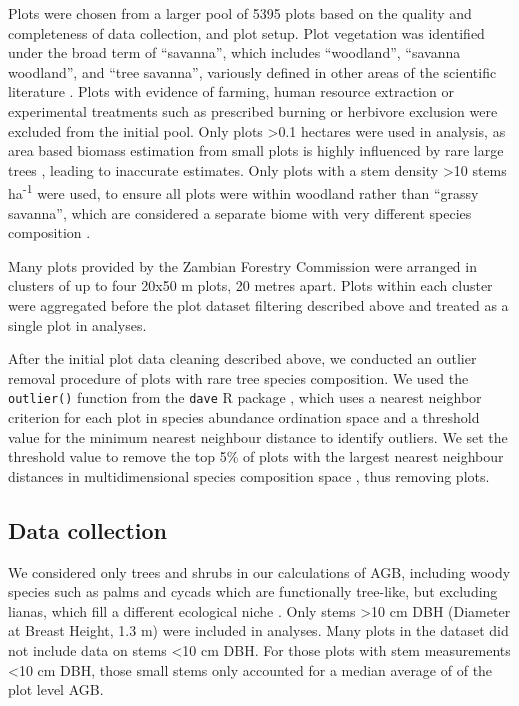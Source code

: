 \documentclass[11pt,a4paper]{article}
\begin{document}
Plots were chosen from a larger pool of 5395 plots based on the quality and completeness of data collection, and plot setup. Plot vegetation was identified under the broad term of ``savanna'', which includes ``woodland'', ``savanna woodland'', and ``tree savanna'', variously defined in other areas of the scientific literature \citep{Ratnam2011, Hill2010}. Plots with evidence of farming, human resource extraction or experimental treatments such as prescribed burning or herbivore exclusion were excluded from the initial pool. Only plots >0.1 hectares were used in analysis, as area based biomass estimation from small plots is highly influenced by rare large trees \citep{Stegen2011}, leading to inaccurate estimates. Only plots with a stem density >10 stems ha\textsuperscript{-1} were used, to ensure all plots were within woodland rather than ``grassy savanna'', which are considered a separate biome with very different species composition \citep{Parr2014}. 

Many plots provided by the Zambian Forestry Commission were arranged in clusters of up to four 20x50 m plots, 20 metres apart. Plots within each cluster were aggregated before the plot dataset filtering described above and treated as a single plot in analyses.

After the initial plot data cleaning described above, we conducted an outlier removal procedure of plots with rare tree species composition. We used the \verb|outlier()| function from the \verb|dave| R package \citep{dave}, which uses a nearest neighbor criterion for each plot in species abundance ordination space and a threshold value for the minimum nearest neighbour distance to identify outliers. We set the threshold value to remove the top 5\% of plots with the largest nearest neighbour distances in multidimensional species composition space \citep{Otto2013}, thus removing \noutliers{} plots.

\subsection{Data collection}
 
We considered only trees and shrubs in our calculations of AGB, including woody species such as palms and cycads which are functionally tree-like, but excluding lianas, which fill a different ecological niche \citep{Selaya2008}. Only stems >10 cm DBH (Diameter at Breast Height, 1.3 m) were included in analyses. Many plots in the dataset did not include data on stems <10 cm DBH. For those plots with stem measurements <10 cm DBH, those small stems only accounted for a median average of \percsmallagb{} of the plot level AGB. 
\end{document}
